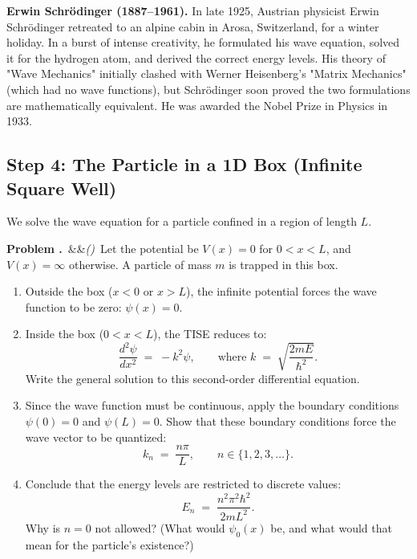 \documentclass[12pt, a4paper, twoside]{book}
\newcounter{problem}[chapter]
\newcommand{\problem}[1][]{\refstepcounter{problem}\medskip\noindent
  \textcolor{accent}{\textbf{Problem \theproblem.}}\ \ifx&#1&\else\textit{(#1)}\ \fi}
\begin{document}
\begin{historybox}
\textbf{Erwin Schrödinger (1887--1961).}
In late 1925, Austrian physicist Erwin Schrödinger retreated to an alpine cabin in Arosa, Switzerland, for a winter holiday. In a burst of intense creativity, he formulated his wave equation, solved it for the hydrogen atom, and derived the correct energy levels. His theory of "Wave Mechanics" initially clashed with Werner Heisenberg's "Matrix Mechanics" (which had no wave functions), but Schrödinger soon proved the two formulations are mathematically equivalent. He was awarded the Nobel Prize in Physics in 1933.
\end{historybox}

\subsection{Step 4: The Particle in a 1D Box (Infinite Square Well)}

We solve the wave equation for a particle confined in a region of length $L$.

\begin{explobox}
\problem Let the potential be $V(x) = 0$ for $0 < x < L$, and $V(x) = \infty$ otherwise. A particle of mass $m$ is trapped in this box.
\begin{enumerate}[label=(\alph*), topsep=2pt]
  \item Outside the box ($x < 0$ or $x > L$), the infinite potential forces the wave function to be zero: $\psi(x) = 0$.
  \item Inside the box ($0 < x < L$), the TISE reduces to:
  \[
    \frac{d^2 \psi}{dx^2} \;=\; -k^2 \psi, \qquad \text{where } k \;=\; \sqrt{\frac{2mE}{\hbar^2}}.
  \]
  Write the general solution to this second-order differential equation.
  \item Since the wave function must be continuous, apply the boundary conditions $\psi(0) = 0$ and $\psi(L) = 0$. Show that these boundary conditions force the wave vector to be quantized:
  \[
    k_n \;=\; \frac{n\pi}{L}, \qquad n \in \{1, 2, 3, \dots\}.
  \]
  \item Conclude that the energy levels are restricted to discrete values:
  \[
    E_n \;=\; \frac{n^2 \pi^2 \hbar^2}{2m L^2}.
  \]
  Why is $n=0$ not allowed? (What would $\psi_0(x)$ be, and what would that mean for the particle's existence?)
\end{enumerate}
\end{explobox}

\newpage
\end{document}
